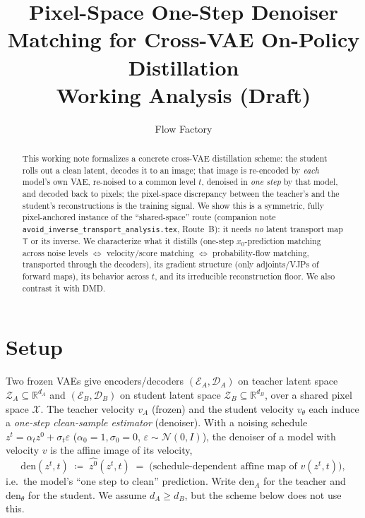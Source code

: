 \documentclass[11pt,a4paper]{article}
\title{\textbf{Pixel-Space One-Step Denoiser Matching for Cross-VAE On-Policy Distillation}\\[0.3em]
\large Working Analysis (Draft)}
\author{Flow Factory}
\date{}
\newcommand{\R}{\mathbb{R}}
\newcommand{\N}{\mathcal{N}}
\newcommand{\Xspace}{\mathcal{X}}
\newcommand{\Za}{\mathcal{Z}_{A}}
\newcommand{\Zb}{\mathcal{Z}_{B}}
\newcommand{\Enc}{\mathcal{E}}
\newcommand{\Dec}{\mathcal{D}}
\newcommand{\den}{\mathrm{den}}
\theoremstyle{definition}
\begin{document}
\maketitle

\begin{abstract}
This working note formalizes a concrete cross-VAE distillation scheme: the student rolls out a
clean latent, decodes it to an image; that image is re-encoded by \emph{each} model's own VAE,
re-noised to a common level $t$, denoised in \emph{one step} by that model, and decoded back to
pixels; the pixel-space discrepancy between the teacher's and the student's reconstructions is the
training signal. We show this is a symmetric, fully pixel-anchored instance of the ``shared-space''
route (companion note \texttt{avoid\_inverse\_transport\_analysis.tex}, Route~B): it needs
\emph{no} latent transport map $\mathsf{T}$ or its inverse. We characterize what it distills
(one-step $x_0$-prediction matching across noise levels $\Leftrightarrow$ velocity/score matching
$\Leftrightarrow$ probability-flow matching, transported through the decoders), its gradient
structure (only adjoints/VJPs of forward maps), its behavior across $t$, and its irreducible
reconstruction floor. We also contrast it with DMD.
\end{abstract}

\section{Setup}
\label{sec:setup}

Two frozen VAEs give encoders/decoders $(\Enc_A,\Dec_A)$ on teacher latent space
$\Za\subseteq\R^{d_A}$ and $(\Enc_B,\Dec_B)$ on student latent space $\Zb\subseteq\R^{d_B}$, over a
shared pixel space $\Xspace$. The teacher velocity $v_A$ (frozen) and the student velocity
$v_\theta$ each induce a \emph{one-step clean-sample estimator} (denoiser). With a noising schedule
$z^t=\alpha_t z^0+\sigma_t\varepsilon$ ($\alpha_0=1,\sigma_0=0$, $\varepsilon\sim\N(0,I)$), the
denoiser of a model with velocity $v$ is the affine image of its velocity,
\begin{equation}
\den(z^t,t)\;\coloneqq\;\widehat{z^0}(z^t,t)
\;=\;\text{(schedule-dependent affine map of } v(z^t,t)\text{)},
\label{eq:den-def}
\end{equation}
i.e.\ the model's ``one step to clean'' prediction. Write $\den_A$ for the teacher and
$\den_\theta$ for the student. We assume $d_A\ge d_B$, but the scheme below does not use this.
\end{document}
